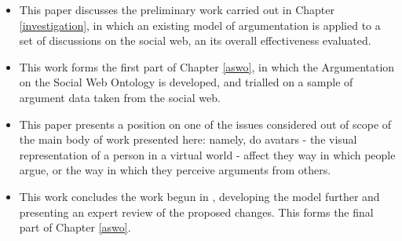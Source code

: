 \begin{itemize}
\item {}

This paper discusses the preliminary work carried out in Chapter \ref{investigation}, in which an existing model of argumentation is applied to a set of discussions on the social web, an its overall effectiveness evaluated.

\item {}

This work forms the first part of Chapter \ref{aswo}, in which the Argumentation on the Social Web Ontology is developed, and trialled on a sample of argument data taken from the social web.

\item {}

This paper presents a position on one of the issues considered out of scope of the main body of work presented here: namely, do avatars - the visual representation of a person in a virtual world \citep{bailenson2004avatars} - affect they way in which people argue, or the way in which they perceive arguments from others.

\item {}

This work concludes the work begun in \citep{Blount2015}, developing the model further and presenting an expert review of the proposed changes. This forms the final part of Chapter \ref{aswo}.


\end{itemize}